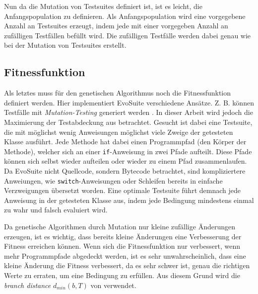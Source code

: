 \documentclass[a4paper,11pt]{article}
\begin{document}
Nun da die Mutation von Testsuites definiert ist, ist es leicht, die Anfangspopulation zu definieren.
Als Anfangspopulation wird eine vorgegebene Anzahl an Testsuites erzeugt, indem jede mit einer vorgegeben Anzahl an zufälligen Testfällen befüllt wird.
Die zufälligen Testfälle werden dabei genau wie bei der Mutation von Testsuites erstellt.

\subsection{Fitnessfunktion}

Als letztes muss für den genetischen Algorithmus noch die Fitnessfunktion definiert werden.
Hier implementiert EvoSuite verschiedene Ansätze.
Z. B. können Testfälle mit \textit{Mutation-Testing} generiert werden \cite{emse14_mutation}.
In dieser Arbeit wird jedoch die Maximierung der Testabdeckung aus \cite{TSE12_EvoSuite} betrachtet.
Gesucht ist dabei eine Testsuite, die mit möglichst wenig Anweisungen möglichst viele Zweige der getesteten Klasse ausführt.
Jede Methode hat dabei einen Programmpfad (den Körper der Methode), welcher sich an einer \lstinline{if}-Anweisung in zwei Pfade aufteilt.
Diese Pfade können sich selbst wieder aufteilen oder wieder zu einem Pfad zusammenlaufen.
Da EvoSuite nicht Quellcode, sondern Bytecode betrachtet, sind kompliziertere Anweiungen, wie \lstinline{switch}-Anweisungen oder Schleifen bereits in einfache Verzweigungen übersetzt worden.
Eine optimale Testsuite führt demnach jede Anweisung in der getesteten Klasse aus, indem jede Bedingung mindestens einmal zu wahr und falsch evaluiert wird.

Da genetische Algorithmen durch Mutation nur kleine zufällige Änderungen erzeugen, ist es wichtig, dass bereits kleine Änderungen eine Verbesserung der Fitness erreichen können.
Wenn sich die Fitnessfunktion nur verbessert, wenn mehr Programmpfade abgedeckt werden, ist es sehr unwahrscheinlich, dass eine kleine Änderung die Fitness verbessert, da es sehr schwer ist, genau die richtigen Werte zu erraten, um eine Bedingung zu erfüllen.
Aus diesem Grund wird die \textit{branch distance} $d_{min}(b, T)$ von \citet{10.1109/32.57624} verwendet.
\end{document}
